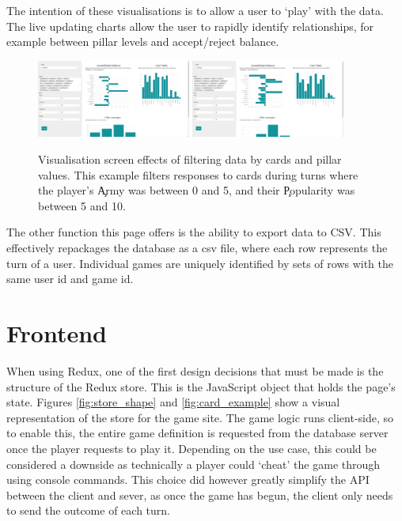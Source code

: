 The intention of these visualisations is to allow a user to `play' with the data. The live updating charts allow the user to rapidly identify relationships, for example between pillar levels and accept/reject balance.

\begin{figure}[!h]
	\centering
	\includegraphics[width=0.45\textwidth]{./images/design/visualisation.png}
	\includegraphics[width=0.45\textwidth]{./images/design/visualisation_filter.png}
	\caption{Visualisation screen effects of filtering data by cards and pillar values. This example filters responses to cards during turns where the player's \c{Army} was between 0 and 5, and their \c{Popularity} was between 5 and 10.}
	\label{fig:visualisation}
\end{figure}

The other function this page offers is the ability to export data to CSV. This effectively repackages the database as a csv file, where each row represents the turn of a user. Individual games are uniquely identified by sets of rows with the same user id and game id.

\section{Frontend}
When using Redux, one of the first design decisions that must be made is the structure of the Redux store. This is the JavaScript object that holds the page's state. Figures \ref{fig:store_shape} and \ref{fig:card_example} show a visual representation of the store for the game site. The game logic runs client-side, so to enable this, the entire game definition is requested from the database server once the player requests to play it. Depending on the use case, this could be considered a downside as technically a player could `cheat' the game through using console commands. This choice did however greatly simplify the API between the client and sever, as once the game has begun, the client only needs to send the outcome of each turn.

